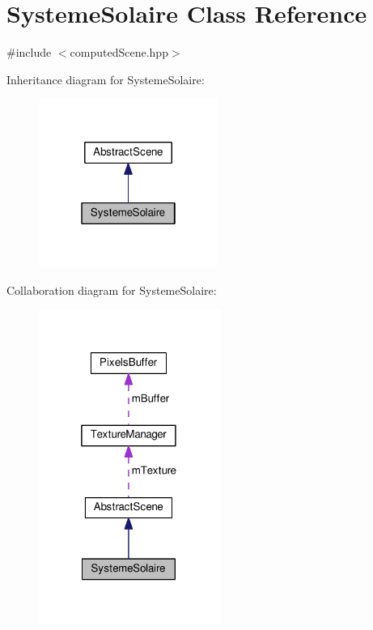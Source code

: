 \hypertarget{class_systeme_solaire}{\section{Systeme\+Solaire Class Reference}
\label{class_systeme_solaire}
}


{\ttfamily \#include $<$computed\+Scene.\+hpp$>$}



Inheritance diagram for Systeme\+Solaire\+:
\nopagebreak
\begin{figure}[H]
\begin{center}
\leavevmode
\includegraphics[width=166pt]{class_systeme_solaire__inherit__graph}
\end{center}
\end{figure}


Collaboration diagram for Systeme\+Solaire\+:
\nopagebreak
\begin{figure}[H]
\begin{center}
\leavevmode
\includegraphics[width=169pt]{class_systeme_solaire__coll__graph}
\end{center}
\end{figure}

